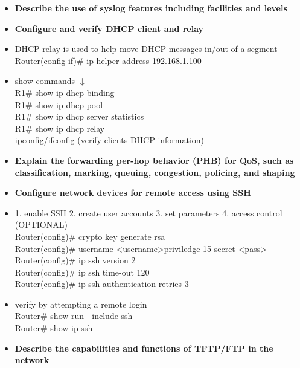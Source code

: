 \documentclass{article}
\begin{document}
\begin{itemize}
  \item \textbf{Describe the use of syslog features including facilities and levels}
  
  \item \textbf{Configure and verify DHCP client and relay}
  	\item[] DHCP relay is used to help move DHCP messages in/out of a segment\\
		Router(config-if)\# ip helper-address 192.168.1.100
	\item[] show commands $\downarrow$\\
		R1\# show ip dhcp binding\\
		R1\# show ip dhcp pool\\
		R1\# show ip dhcp server statistics\\
		R1\# show ip dhcp relay\\
		ipconfig/ifconfig (verify clients DHCP information)
  \item \textbf{Explain the forwarding per-hop behavior (PHB) for QoS, such as classification, marking, queuing, congestion, policing, and shaping}
  
  \item \textbf{Configure network devices for remote access using SSH}
  	\item[] 1. enable SSH 2. create user accounts 3. set parameters 4. access control (OPTIONAL)\\
		Router(config)\# crypto key generate rsa\\
		Router(config)\# username \textless username\textgreater priviledge 15 secret \textless pass\textgreater\\
		Router(config)\# ip ssh version 2\\
		Router(config)\# ip ssh time-out 120\\
		Router(config)\# ip ssh authentication-retries 3
	\item[] verify by attempting a remote login\\
		Router\# show run | include ssh\\
		Router\# show ip ssh
  
  \item \textbf{Describe the capabilities and functions of TFTP/FTP in the network}
\end{itemize}
\end{document}
